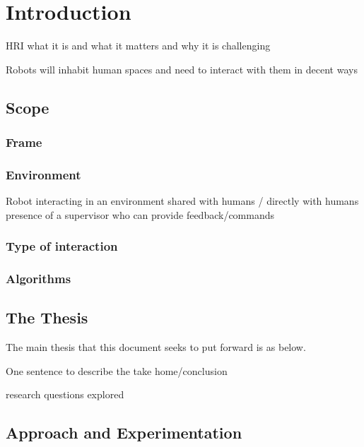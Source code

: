 \chapter{Introduction} \label{chap:intro}

HRI what it is and what it matters and why it is challenging

Robots will inhabit human spaces and need to interact with them in decent ways

\section{Scope}\label{sec:intro-scope}

\subsection{Frame}

\subsection{Environment} \label{sec:scope-social}
Robot interacting in an environment shared with humans / directly with humans
presence of a supervisor who can provide feedback/commands

\subsection{Type of interaction}


\subsection{Algorithms}


\section{The Thesis}\label{sec:intro-thesis}
The main thesis that this document seeks to put forward is as below.

One sentence to describe the take home/conclusion

research questions explored

\section{Approach and Experimentation}\label{sec:intro-exps}

